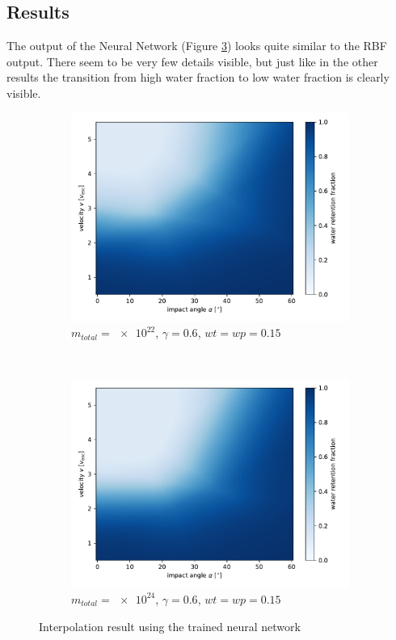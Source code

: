 \subsection{Results}

The output of the Neural Network (Figure \ref{fig:nnresults}) looks quite similar to the RBF output. There seem to be very few details visible, but just like in the other results the transition from high water fraction to low water fraction is clearly visible.

\begin{figure}
	\centering
	\begin{subfigure}[t]{0.5\textwidth}
		\centering
		\includegraphics[width=\linewidth]{images/plots/nn1.pdf}
		\caption{$m_{total}=\num{e22}$, $\gamma=0.6$, $wt=wp=0.15$}
		\label{fig:nn1}
	\end{subfigure}%
	~ 
	\begin{subfigure}[t]{0.5\textwidth}
		\centering
		\includegraphics[width=\linewidth]{images/plots/nn2.pdf}
		\caption{$m_{total}=\num{e24}$, $\gamma=0.6$, $wt=wp=0.15$}
		\label{fig:nn2}
	\end{subfigure}
	\caption{Interpolation result using the trained neural network}
	\label{fig:nnresults}
\end{figure}

